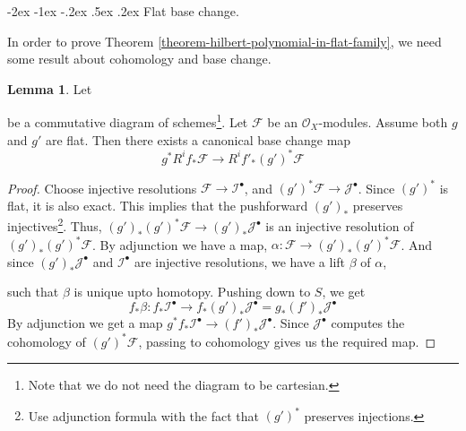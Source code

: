 \documentclass[11pt]{amsart}
\makeatletter
\renewcommand\subsection{\@startsection {subsection}{1}{\z@}%
	{-2ex \@plus -1ex \@minus -.2ex}%
	{.5ex \@plus.2ex}%
	{\normalfont\bfseries}}
\newcommand{\sF}{{\mathcal F}}
\newcommand{\sI}{{\mathcal I}}
\newcommand{\sJ}{{\mathcal J}}
\theoremstyle{definition}
\newtheorem{lemma}[theorem]{Lemma}
\makeatother
\begin{document}
\subsection{Flat base change.}

In order to prove Theorem \ref{theorem-hilbert-polynomial-in-flat-family}, we need some result about cohomology and base change.

\begin{lemma}
	\label{lemma-base-change-map-flat-case}
	Let
	\begin{center}
	\end{center}
	be a commutative diagram of schemes\footnote{Note that we do not need the diagram to be cartesian.}.
	Let $\mathcal{F}$ be an	$\mathcal{O}_X$-modules.
	Assume both $g$ and $g'$ are flat.
	Then there exists a canonical base change map
	\[
	g^*R^if_*\mathcal{F}
	\longrightarrow
	R^if'_*(g')^*\mathcal{F}\]
\end{lemma}

\begin{proof}
	Choose injective resolutions $\sF\rightarrow \sI^{\bullet}$, and $(g')^*\sF\rightarrow \sJ^{\bullet}$. Since $(g')^*$ is flat, it is also exact. This implies that the pushforward $(g')_*$ preserves injectives\footnote{Use adjunction formula with the fact that $(g')^*$ preserves injections.}. Thus, $(g')_*(g')^*\sF\rightarrow (g')_*\sJ^{\bullet}$ is an injective resolution of $(g')_*(g')^*\sF$. By adjunction we have a map, $\alpha: \sF \rightarrow (g')_*(g')^*\sF$. And since $(g')_*\sJ^{\bullet}$ and $\sI^{\bullet}$ are injective resolutions, we have a lift $\beta$ of $\alpha$,
	\begin{center}
	\end{center}
	such that $\beta$ is unique upto homotopy. Pushing down to $S$, we get
	\[f_*\beta :
	f_*\mathcal{I}^\bullet
	\longrightarrow
	f_*(g')_*\mathcal{J}^\bullet
	=
	g_*(f')_*\mathcal{J}^\bullet
	\]
	By adjunction we get a map $g^*f_*\sI^\bullet \rightarrow (f')_*\sJ^\bullet$. Since $\sJ^\bullet$ computes the cohomology of $(g')^*\sF$, passing to cohomology gives us the required map.
\end{proof}
\end{document}
